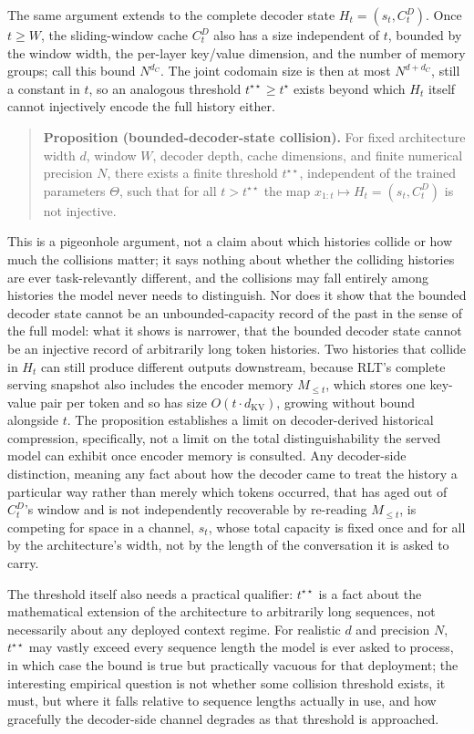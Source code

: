\documentclass[11pt]{article}
\begin{document}
The same argument extends to the complete decoder state $H_t = (s_t, C_t^D)$. Once $t \ge W$, the sliding-window cache $C_t^D$ also has a size independent of $t$, bounded by the window width, the per-layer key/value dimension, and the number of memory groups; call this bound $N^{d_C}$. The joint codomain size is then at most $N^{d + d_C}$, still a constant in $t$, so an analogous threshold $t^{\star\star} \ge t^\star$ exists beyond which $H_t$ itself cannot injectively encode the full history either.

\begin{quote}
\textbf{Proposition (bounded-decoder-state collision).} For fixed architecture width $d$, window $W$, decoder depth, cache dimensions, and finite numerical precision $N$, there exists a finite threshold $t^{\star\star}$, independent of the trained parameters $\Theta$, such that for all $t > t^{\star\star}$ the map $x_{1:t} \mapsto H_t = (s_t, C_t^D)$ is not injective.
\end{quote}

This is a pigeonhole argument, not a claim about which histories collide or how much the collisions matter; it says nothing about whether the colliding histories are ever task-relevantly different, and the collisions may fall entirely among histories the model never needs to distinguish. Nor does it show that the bounded decoder state cannot be an unbounded-capacity record of the past in the sense of the full model: what it shows is narrower, that the bounded decoder state cannot be an injective record of arbitrarily long token histories. Two histories that collide in $H_t$ can still produce different outputs downstream, because RLT's complete serving snapshot also includes the encoder memory $M_{\le t}$, which stores one key-value pair per token and so has size $O(t \cdot d_{\mathrm{KV}})$, growing without bound alongside $t$. The proposition establishes a limit on decoder-derived historical compression, specifically, not a limit on the total distinguishability the served model can exhibit once encoder memory is consulted. Any decoder-side distinction, meaning any fact about how the decoder came to treat the history a particular way rather than merely which tokens occurred, that has aged out of $C_t^D$'s window and is not independently recoverable by re-reading $M_{\le t}$, is competing for space in a channel, $s_t$, whose total capacity is fixed once and for all by the architecture's width, not by the length of the conversation it is asked to carry.

The threshold itself also needs a practical qualifier: $t^{\star\star}$ is a fact about the mathematical extension of the architecture to arbitrarily long sequences, not necessarily about any deployed context regime. For realistic $d$ and precision $N$, $t^{\star\star}$ may vastly exceed every sequence length the model is ever asked to process, in which case the bound is true but practically vacuous for that deployment; the interesting empirical question is not whether some collision threshold exists, it must, but where it falls relative to sequence lengths actually in use, and how gracefully the decoder-side channel degrades as that threshold is approached.
\end{document}
